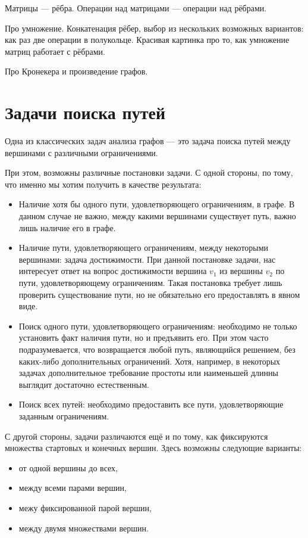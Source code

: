  Матрицы --- рёбра. Операции над матрицами --- операции над рёбрами. 

Про умножение. Конкатенация рёбер, выбор из нескольких возможных вариантов: как раз две операции в полукольце. Красивая картинка про то, как умножение матриц работает с рёбрами. 

Про Кронекера и произведение графов.

\section{Задачи поиска путей}

Одна из классических задач анализа графов --- это задача поиска путей между вершинами с различными ограничениями.

При этом, возможны различные постановки задачи.
С одной стороны, по тому, что именно мы хотим получить в качестве результата:
\begin{itemize}
\item Наличие хотя бы одного пути, удовлетворяющего ограничениям, в графе. В данном случае не важно, между какими вершинами существует путь, важно лишь наличие его в графе.
\item Наличие пути, удовлетворяющего ограничениям, между некоторыми вершинами: задача достижимости.
      При данной постановке задачи, нас интересует ответ на вопрос достижимости вершина $v_1$ из вершины $v_2$ по пути, удовлетворяющему ограничениям.
      Такая постановка требует лишь проверить существование пути, но не обязательно его предоставлять в явном виде.
\item Поиск одного пути, удовлетворяющего ограничениям: необходимо не только установить факт наличия пути, но и  предъявить его. При этом часто подразумевается, что возвращается любой путь, являющийся решением, без каких-либо дополнительных ограничений. Хотя, например, в некоторых задачах дополнительное требование простоты или наименьшей длинны выглядит достаточно естественным.
\item Поиск всех путей: необходимо предоставить все пути, удовлетворяющие заданным ограничениям.
\end{itemize}

С другой стороны, задачи различаются ещё и по тому, как фиксируются множества стартовых и конечных вершин.
Здесь возможны следующие варианты:
\begin{itemize}
\item от одной вершины до всех,
\item между всеми парами вершин,
\item межу фиксированной парой вершин,
\item между двумя множествами вершин.
\end{itemize}

